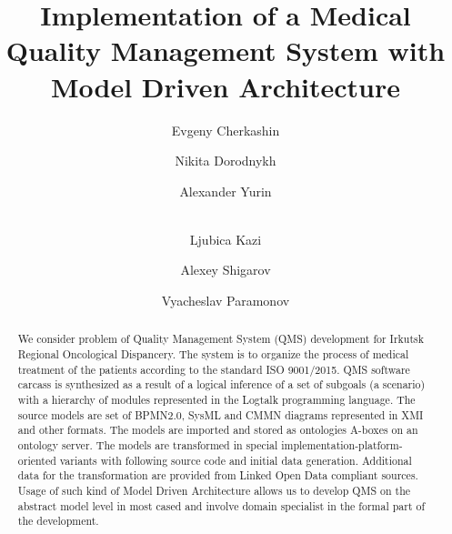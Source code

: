 \documentclass{llncs}
\begin{document}
\title{Implementation of a Medical Quality Management System with Model Driven Architecture}


\author{Evgeny Cherkashin\and
Nikita Dorodnykh\and
Alexander Yurin\and\\
Ljubica Kazi\and
Alexey Shigarov\and
Vyacheslav Paramonov
}




\maketitle

\begin{abstract} %
We consider problem of Quality Management System (QMS) development for Irkutsk Regional Oncological Dispancery.  The system is to organize the process of medical treatment of the patients according to the standard ISO 9001/2015.  QMS software carcass is synthesized as a result of a logical inference of a set of subgoals (a scenario) with a hierarchy of modules represented in the Logtalk programming language.  The source models are set of BPMN2.0, SysML and CMMN diagrams represented in XMI and other formats.  The models are imported and stored as ontologies A-boxes on an ontology server.  The models are transformed in special implementation-platform-oriented variants with following source code and initial data generation.  Additional data for the transformation are provided from Linked Open Data compliant sources.  Usage of such kind of Model Driven Architecture allows us to develop QMS on the abstract model level in most cased and involve domain specialist in the formal part of the development.


\end{abstract}
\end{document}
